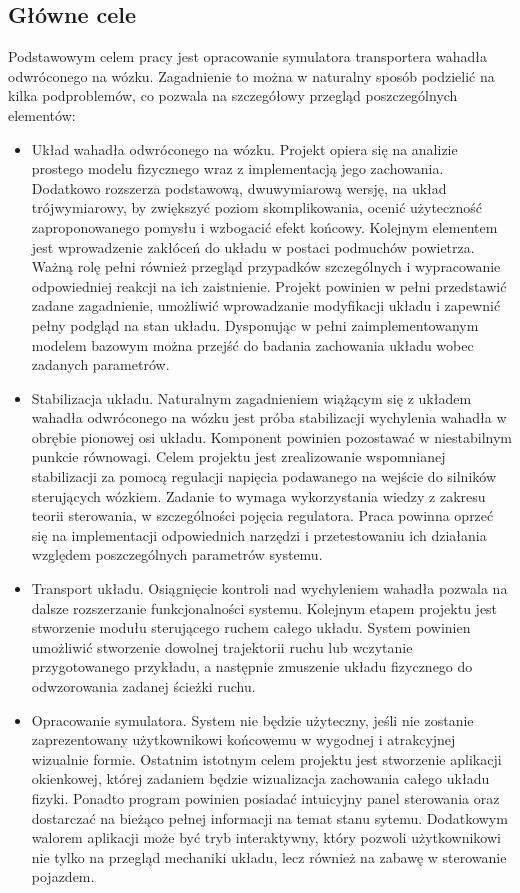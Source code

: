 \documentclass[12pt, oneside]{report}
\theoremstyle{definition}
\begin{document}
\subsection{Główne cele}
Podstawowym celem pracy jest opracowanie symulatora transportera wahadła odwróconego na wózku. Zagadnienie to można w naturalny sposób podzielić na kilka podproblemów, co pozwala na szczegółowy przegląd poszczególnych elementów:
\begin{itemize}
\item Układ wahadła odwróconego na wózku. Projekt opiera się na analizie prostego modelu fizycznego wraz z implementacją jego zachowania. Dodatkowo rozszerza podstawową, dwuwymiarową wersję, na układ trójwymiarowy, by zwiększyć poziom skomplikowania, ocenić użyteczność zaproponowanego pomysłu i wzbogacić efekt końcowy. Kolejnym elementem jest wprowadzenie zakłóceń do układu w postaci podmuchów powietrza. Ważną rolę pełni również przegląd przypadków szczególnych i wypracowanie odpowiedniej reakcji na ich zaistnienie. Projekt powinien w pełni przedstawić zadane zagadnienie, umożliwić wprowadzanie modyfikacji układu i zapewnić pełny podgląd na stan układu. Dysponując w pełni zaimplementowanym modelem bazowym można przejść do badania zachowania układu wobec zadanych parametrów.
\item Stabilizacja układu. Naturalnym zagadnieniem wiążącym się z układem wahadła odwróconego na wózku jest próba stabilizacji wychylenia wahadła w obrębie pionowej osi układu. Komponent powinien pozostawać w niestabilnym punkcie równowagi. Celem projektu jest zrealizowanie wspomnianej stabilizacji za pomocą regulacji napięcia podawanego na wejście do silników sterujących wózkiem. Zadanie to wymaga wykorzystania wiedzy z zakresu teorii sterowania, w szczególności pojęcia regulatora. Praca powinna oprzeć się na implementacji odpowiednich narzędzi i przetestowaniu ich działania względem poszczególnych parametrów systemu. 
\item Transport układu. Osiągnięcie kontroli nad wychyleniem wahadła pozwala na dalsze rozszerzanie funkcjonalności systemu. Kolejnym etapem projektu jest stworzenie modułu sterującego ruchem całego układu. System powinien umożliwić stworzenie dowolnej trajektorii ruchu lub wczytanie przygotowanego przykładu, a następnie zmuszenie układu fizycznego do odwzorowania zadanej ścieżki ruchu.
\item Opracowanie symulatora. System nie będzie użyteczny, jeśli nie zostanie zaprezentowany użytkownikowi końcowemu w wygodnej i atrakcyjnej wizualnie formie. Ostatnim istotnym celem projektu jest stworzenie aplikacji okienkowej, której zadaniem będzie wizualizacja zachowania całego układu fizyki. Ponadto program powinien posiadać intuicyjny panel sterowania oraz dostarczać na bieżąco pełnej informacji na temat stanu sytemu. Dodatkowym walorem aplikacji może być tryb interaktywny, który pozwoli użytkownikowi nie tylko na przegląd mechaniki układu, lecz również na zabawę w sterowanie pojazdem.
\end{itemize}
\end{document}
